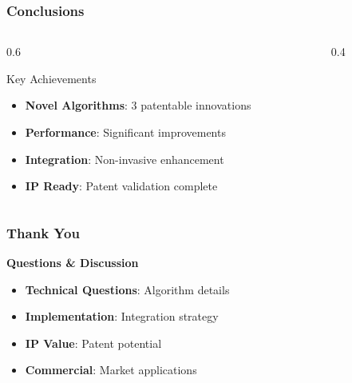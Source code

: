 \documentclass{beamer}
\begin{document}
\begin{frame}
\frametitle{Conclusions}
\begin{columns}
\begin{column}{0.6\textwidth}
\begin{block}{Key Achievements}
\begin{itemize}
\item \textbf{Novel Algorithms}: 3 patentable innovations
\item \textbf{Performance}: Significant improvements
\item \textbf{Integration}: Non-invasive enhancement
\item \textbf{IP Ready}: Patent validation complete
\end{itemize}
\end{block}
\end{column}
\begin{column}{0.4\textwidth}
\begin{center}
\end{center}
\end{column}
\end{columns}
\end{frame}

\begin{frame}
\frametitle{Thank You}
\begin{center}
\begin{Large}
\textbf{Questions \& Discussion}
\end{Large}
\vspace{1cm}
\begin{itemize}
\item \textbf{Technical Questions}: Algorithm details
\item \textbf{Implementation}: Integration strategy
\item \textbf{IP Value}: Patent potential
\item \textbf{Commercial}: Market applications
\end{itemize}
\end{center}
\end{frame}
\end{document}
